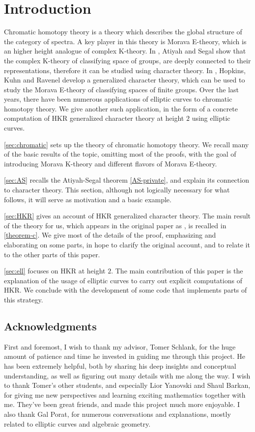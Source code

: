 \section{Introduction}

Chromatic homotopy theory is a theory which describes the global structure of the category of spectra.
A key player in this theory is Morava E-theory, which is an higher height analogue of complex K-theory.
In \cite{AS}, Atiyah and Segal show that the complex K-theory of classifying space of groups, are deeply connected to their representations, therefore it can be studied using character theory.
In \cite{HKR}, Hopkins, Kuhn and Ravenel develop a generalized character theory, which can be used to study the Morava E-theory of classifying spaces of finite groups.
Over the last years, there have been numerous applications of elliptic curves to chromatic homotopy theory.
We give another such application, in the form of a concrete computation of HKR generalized character theory at height $2$ using elliptic curves.

\cref{sec:chromatic} sets up the theory of chromatic homotopy theory.
We recall many of the basic results of the topic, omitting most of the proofs, with the goal of introducing Morava K-theory and different flavors of Morava E-theory.

\cref{sec:AS} recalls the Atiyah-Segal theorem \ref{AS-private}, and explain its connection to character theory.
This section, although not logically necessary for what follows, it will serve as motivation and a basic example.

\cref{sec:HKR} gives an account of HKR generalized character theory.
The main result of the theory for us, which appears in the original paper as \cite[Theorem C]{HKR}, is recalled in \cref{theorem-c}.
We give most of the details of the proof, emphasizing and elaborating on some parts, in hope to clarify the original account, and to relate it to the other parts of this paper.

\cref{sec:ell} focuses on HKR at height $2$.
The main contribution of this paper is the explanation of the usage of elliptic curves to carry out explicit computations of HKR.
We conclude with the development of some code that implements parts of this strategy.



\subsection*{Acknowledgments}

First and foremost, I wish to thank my advisor, Tomer Schlank, for the huge amount of patience and time he invested in guiding me through this project.
He has been extremely helpful, both by sharing his deep insights and conceptual understanding, as well as figuring out many details with me along the way.
I wish to thank Tomer's other students, and especially Lior Yanovski and Shaul Barkan, for giving me new perspectives and learning exciting mathematics together with me.
They've been great friends, and made this project much more enjoyable.
I also thank Gal Porat, for numerous conversations and explanations, mostly related to elliptic curves and algebraic geometry.